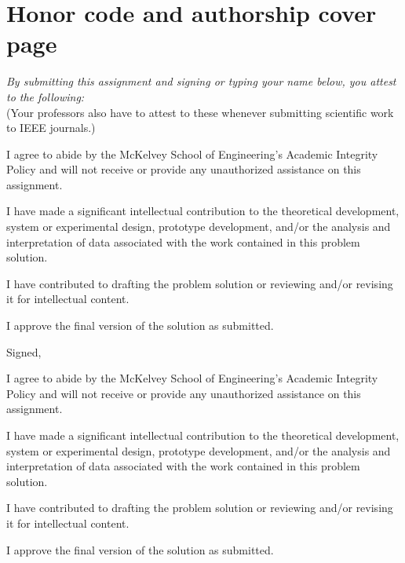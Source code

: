\documentclass[11pt,letterpaper]{article}
\begin{document}
\section*{Honor code and authorship cover page}

\noindent \textit{By submitting this assignment and signing or typing your name below, you attest to the following:} \\
(Your professors also have to attest to these whenever submitting scientific work to IEEE journals.)

\begin{todolist}
    \item I agree to abide by the McKelvey School of Engineering's Academic Integrity Policy and will not receive or provide any unauthorized assistance on this assignment.
    \item I have made a significant intellectual contribution to the theoretical development, system or experimental design, prototype development, and/or the analysis and interpretation of data associated with the work contained in this problem solution.
    \item I have contributed to drafting the problem solution or reviewing and/or revising it for intellectual content.
    \item I approve the final version of the solution as submitted.
\end{todolist}

\vspace{10pt}

\noindent Signed, \underline{\hspace{9cm}}

\begin{todolist}
    \item I agree to abide by the McKelvey School of Engineering's Academic Integrity Policy and will not receive or provide any unauthorized assistance on this assignment.
    \item I have made a significant intellectual contribution to the theoretical development, system or experimental design, prototype development, and/or the analysis and interpretation of data associated with the work contained in this problem solution.
    \item I have contributed to drafting the problem solution or reviewing and/or revising it for intellectual content.
    \item I approve the final version of the solution as submitted.
\end{todolist}
\end{document}

